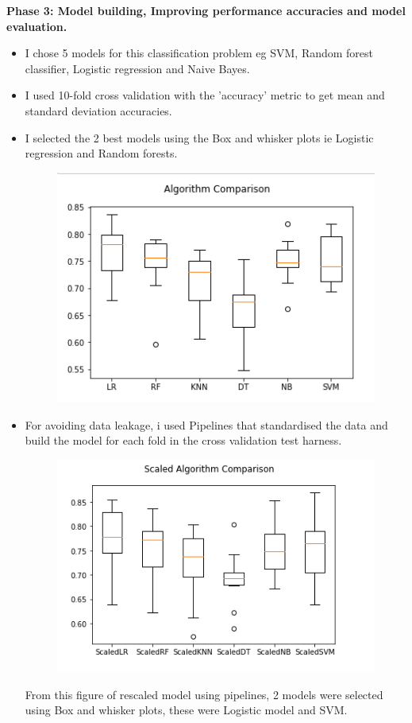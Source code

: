 \documentclass[11pt]{article}
\begin{document}
\textbf{Phase 3: Model building, Improving performance accuracies and model evaluation.}
\begin{itemize}
	\item I chose 5 models for this classification problem eg SVM, Random forest classifier, Logistic regression and Naive Bayes.\\
	\item I used 10-fold cross validation with the 'accuracy' metric to get mean and standard deviation accuracies.\\
	\item I selected the 2 best models using the Box and whisker plots ie Logistic regression and Random forests.\\
	\newpage
	\begin{figure}[h]
		\centerline{\small 
			\includegraphics[height=0.2\textheight]  {y1}}
	\end{figure}
	
	\item For avoiding data leakage, i used Pipelines that standardised the data and build the model for each fold in the cross validation test harness.\\
	\begin{figure}[h]
		\centerline{\small 
			\includegraphics[height=0.2\textheight]  {y2}}
	\end{figure}
	From this figure of rescaled model using pipelines, 2 models were selected using Box and whisker plots, these were   Logistic model and SVM.\\
	

\end{itemize}
\end{document}

